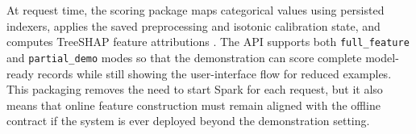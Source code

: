 At request time, the scoring package maps categorical values using persisted indexers, applies the saved preprocessing and isotonic calibration state, and computes TreeSHAP feature attributions \parencite{lundberg2017shap}. The API supports both \texttt{full\_feature} and \texttt{partial\_demo} modes so that the demonstration can score complete model-ready records while still showing the user-interface flow for reduced examples. This packaging removes the need to start Spark for each request, but it also means that online feature construction must remain aligned with the offline contract if the system is ever deployed beyond the demonstration setting.
